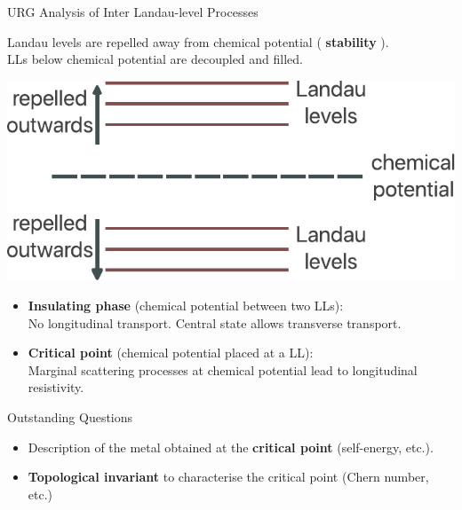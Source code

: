 \documentclass[11pt,aspectratio=169]{beamer}
\newcommand\focus[1]{%
	{\alert{\textbf{#1}}}
}
\begin{document}
\begin{frame}{URG Analysis of Inter Landau-level Processes}
\begin{minipage}{0.45\textwidth}
	Landau levels are repelled away from chemical potential (\focus{stability}).\\[10pt]

LLs below chemical potential are decoupled and filled. 
\end{minipage}
\hspace*{\fill}
\begin{minipage}{0.45\textwidth}
	\includegraphics[width=\textwidth]{interLL.pdf}
\end{minipage}

\vspace{\fill}
\begin{itemize}
	\item \focus{Insulating phase} (chemical potential between two LLs):\\
No longitudinal transport. Central state allows transverse transport.
	\item \focus{Critical point} (chemical potential placed at a LL):\\
Marginal scattering processes at chemical potential lead to longitudinal resistivity.
\end{itemize}
\end{frame}

\begin{frame}{Outstanding Questions}
	\begin{itemize}
		\item Description of the metal obtained at the \focus{critical point} (self-energy, etc.).\\[10pt]
		\item \focus{Topological invariant} to characterise the critical point (Chern number, etc.) \\[10pt]
	\end{itemize}
\end{frame}
\end{document}
